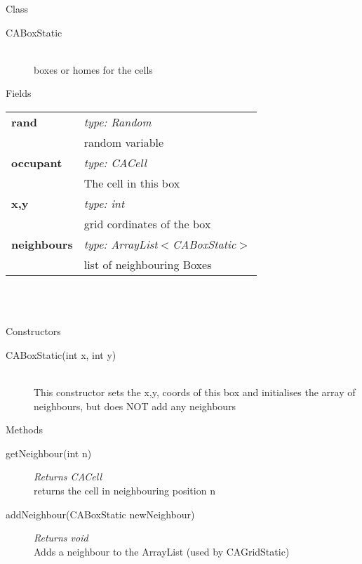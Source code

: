 \documentclass[11pt,a4paper]{article}
\newcommand \bt{\begin{tabular*}{0.99\textwidth}{p{0.25\textwidth}p{0.74\textwidth}}}
\newcommand \et{\end{tabular*}\\}
\newcommand{\hs}{\hspace{0.5cm}}
\newenvironment{di}
{\begin{flushright}
\begin{minipage}{0.95\textwidth}
\begin{description}
}
{\end{description}
\end{minipage}
\end{flushright}
}
\begin{document}
\noindent
\colorbox{classbg}{\parbox{1.0\textwidth}{\Large{Class}}}
\begin{di}
\item[\large{CABoxStatic}]\qquad\\
boxes or homes for the cells
\end{di}
\colorbox{fieldbg}{\parbox{1.0\textwidth}{\Large{Fields}}}\vspace{0.5cm}
\bt
\hs \textbf{rand} & \emph{type: Random}\\
& \hs random variable\\
\hs \textbf{occupant} & \emph{type: CACell}\\
& \hs The cell in this box\\
\hs \textbf{x,y} & \emph{type: int}\\
& \hs grid cordinates of the box\\
\hs \textbf{neighbours} & \emph{type: ArrayList$<$CABoxStatic$>$}\\
& \hs list of neighbouring Boxes\\
\et
\\\colorbox{conbg}{\parbox{1.0\textwidth}{\Large{Constructors}}}
\begin{di}
\item[CABoxStatic(int x, int y)]\qquad\\
This constructor sets the x,y, coords of this box and initialises the array of neighbours, but does NOT add any neighbours
\end{di}
\colorbox{descriptbg}{\parbox{1.0\textwidth}{\Large{Methods}}}
\begin{di}
\item[getNeighbour(int n)]\emph{Returns CACell}\\
returns the cell in neighbouring position n\\
\item[addNeighbour(CABoxStatic newNeighbour)]\emph{Returns void}\\
Adds a neighbour to the ArrayList (used by CAGridStatic)\\
\end{di}
\end{document}
